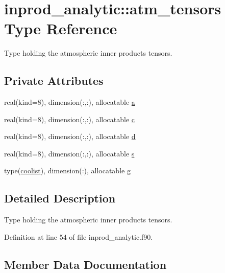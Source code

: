 \hypertarget{structinprod__analytic_1_1atm__tensors}{}\section{inprod\+\_\+analytic\+:\+:atm\+\_\+tensors Type Reference}
\label{structinprod__analytic_1_1atm__tensors}


Type holding the atmospheric inner products tensors.  


\subsection*{Private Attributes}
\begin{DoxyCompactItemize}
\item 
real(kind=8), dimension(\+:,\+:), allocatable \hyperlink{structinprod__analytic_1_1atm__tensors_af50962da7a48c98d8b118dee9cc16dcd}{a}
\item 
real(kind=8), dimension(\+:,\+:), allocatable \hyperlink{structinprod__analytic_1_1atm__tensors_a6f560bb68ce7081409034cb755e7a164}{c}
\item 
real(kind=8), dimension(\+:,\+:), allocatable \hyperlink{structinprod__analytic_1_1atm__tensors_a00e06ac193f03e4dcd337439cc489f78}{d}
\item 
real(kind=8), dimension(\+:,\+:), allocatable \hyperlink{structinprod__analytic_1_1atm__tensors_ad95a5329b72aae59807e7cdf043ab52c}{s}
\item 
type(\hyperlink{structtensor_1_1coolist}{coolist}), dimension(\+:), allocatable \hyperlink{structinprod__analytic_1_1atm__tensors_a63ff90c051660c3b798743810e798dac}{g}
\end{DoxyCompactItemize}


\subsection{Detailed Description}
Type holding the atmospheric inner products tensors. 

Definition at line 54 of file inprod\+\_\+analytic.\+f90.



\subsection{Member Data Documentation}
